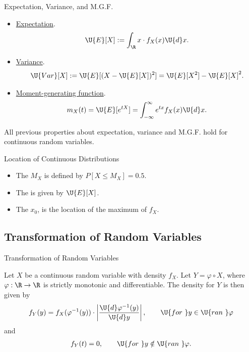 \begin{frame}{Expectation, Variance, and M.G.F.}

\justifying
\begin{itemize}
	\item \underline{Expectation}.
	\begin{align*}
	\U{E}[X] := \int_{\R} x\cdot f_X(x)\U{d}x.
	\end{align*}
	\item \underline{Variance}.
	\begin{align*}
	\U{Var}[X] := \U{E}[(X-\U{E}[X])^2] = \U{E}[X^2] - \U{E}[X]^2.
	\end{align*}
	\item \underline{Moment-generating function}.
	\begin{align*}
	m_X(t) = \U{E}[e^{tX}] = \int_{-\infty}^{\infty} e^{tx}f_X(x) \U{d}x.
	\end{align*}
\end{itemize}
 All previous properties about expectation, variance and M.G.F. hold for continuous random variables.

\end{frame}


\begin{frame}{Location of Continuous Distributions}

\begin{itemize}
	\justifying
	\item The  $M_X$ is defined by $P[X\leq M_X] = 0.5$.
	\item The  is given by $\U{E}[X]$.
	\item The  $x_0$, is the location of the maximum of $f_X$.
\end{itemize}

\end{frame}


\subsection{Transformation of Random Variables}

\begin{frame}{Transformation of Random Variables}

\justifying
{} Let $X$ be a continuous random variable with density $f_X$. Let $Y = \varphi\circ X$, where $\varphi: \R\rightarrow \R$ is strictly monotonic and differentiable. The density for $Y$ is then given by
\begin{align*}
f_Y(y) = f_X(\varphi^{-1}(y))\cdot \left|\frac{\U{d}\varphi^{-1}(y)}{\U{d}y} \right|, \qquad \U{for\ } y\in \U{ran\ }\varphi
\end{align*}
and 
\begin{align*}
f_Y(t) = 0, \qquad \U{for\ } y\notin \U{ran\ } \varphi.
\end{align*}


\end{frame}


